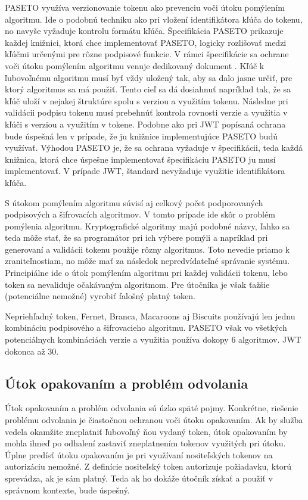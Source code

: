 PASETO využíva verzionovanie tokenu ako prevenciu voči útoku pomýlením algoritmu. Ide o podobnú techniku ako pri vložení identifikátora kľúča do tokenu, no navyše vyžaduje kontrolu formátu kľúča. Špecifikácia PASETO \cite{paseto_git} prikazuje každej knižnici, ktorá chce implementovať PASETO, logicky rozlišovať medzi kľúčmi určenými pre rôzne podpisové funkcie. V rámci špecifikácie sa ochrane voči útoku pomýlením algoritmu venuje dedikovaný dokument \cite{alg_lucidity}. Kľúč k ľubovoľnému algoritmu musí byť vždy uložený tak, aby sa dalo jasne určiť, pre ktorý algoritmus sa má použiť. Tento cieľ sa dá dosiahnuť napríklad tak, že sa kľúč uloží v nejakej štruktúre spolu s verziou a využitím tokenu. Následne pri validácii podpisu tokenu musí prebehnúť kontrola rovnosti verzie a využitia v kľúči s verziou a využitím v tokene. Podobne ako pri JWT popísaná ochrana bude úspešná len v prípade, že ju knižnice implementujúce PASETO budú využívať. Výhodou PASETO je, že sa ochrana vyžaduje v špecifikácii, teda každá knižnica, ktorá chce úspešne implementovať špecifikáciu PASETO ju musí implementovať. V prípade JWT, štandard \cite{jwt_rfc} nevyžaduje využitie identifikátora kľúča.

S útokom pomýlením algoritmu súvisí aj celkový počet podporovaných podpisových a šifrovacích algoritmov. V tomto prípade ide skôr o problém pomýlenia algoritmu. Kryptografické algoritmy majú podobné názvy, ľahko sa teda môže stať, že sa programátor pri ich výbere pomýli a napríklad pri generovaní a validácii tokenu použije rôzny algoritmus. Toto nevedie priamo k zraniteľnostiam, no môže mať za následok nepredvídateľné správanie systému. Principiálne ide o útok pomýlením algoritmu pri každej validácii tokenu, lebo token sa nevaliduje očakávaným algoritmom. Pre útočníka je však ťažšie (potenciálne nemožné) vyrobiť falošný platný token.

Nepriehľadný token, Fernet, Branca, Macaroons aj Biscuits používajú len jednu kombináciu podpisového a šifrovacieho algoritmu. PASETO však vo všetkých potenciálnych kombináciách verzie a využitia používa dokopy 6 algoritmov. JWT dokonca až 30.

\subsection{Útok opakovaním a problém odvolania}

\label{sec:replay} %

Útok opakovaním a problém odvolania sú úzko späté pojmy. Konkrétne, riešenie problému odvolania je čiastočnou ochranou voči útoku opakovaním. Ak by služba vedela okamžite zneplatniť ľubovoľný ňou vydaný token, útok opakovaním by mohla ihneď po odhalení zastaviť zneplatnením tokenov využitých pri útoku. Úplne predísť útoku opakovaním je pri využívaní nositeľských tokenov na autorizáciu nemožné. Z definície nositeľský token autorizuje požiadavku, ktorú sprevádza, ak je sám platný. Teda ak ho dokáže útočník získať a použiť v správnom kontexte, bude úspešný.

